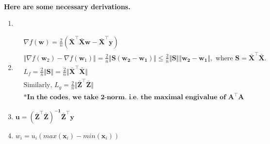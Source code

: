 \documentclass[11pt,letter,notitlepage]{article}
\begin{document}
\begin{solution}
	\textbf{Here are some necessary derivations.}
	\begin{enumerate}
		\item 
		\item
		\begin{align*}
		&\nabla f(\mathbf{w}) = \frac{2}{n}\left(\bar{\mathbf{X}}^{\top}\bar{\mathbf{X}}\mathbf{w}-\bar{\mathbf{X}}^\top\mathbf{y} \right) \\
		&\Vert \nabla f(\mathbf{w}_2) - \nabla f(\mathbf{w}_1)\Vert = \frac{2}{n}\Vert\mathbf{S(w_2-w_1)}\Vert\leqslant\frac{2}{n}\Vert\mathbf{S}\Vert\Vert\mathbf{w_2-w_1}\Vert, \text{ where } \mathbf{S}=\bar{\mathbf{X}}^{\top}\bar{\mathbf{X}}.\\
		&L_f = \frac{2}{n}\Vert\mathbf{S}\Vert=\frac{2}{n}\Vert\mathbf{\bar{X}^\top \bar{X}}\Vert\\
		&\text{Similarly, } L_g = \frac{2}{n}\Vert \mathbf{\bar{Z}^\top \bar{Z}}\Vert\\
		&\textbf{*In the codes, we take 2-norm. i.e. the maximal engivalue of } \mathbf{A^\top A}
		\end{align*}
		
		\item
		$\mathbf{u}=\mathbf{(\bar{Z}^\top \bar{Z})^{-1}\bar{Z}^\top y}$
		
		\item
		$w_i=u_i(max(\mathbf{x}_i)-min(\mathbf{x}_i))$
	\end{enumerate}
\end{solution}


\end{document}
